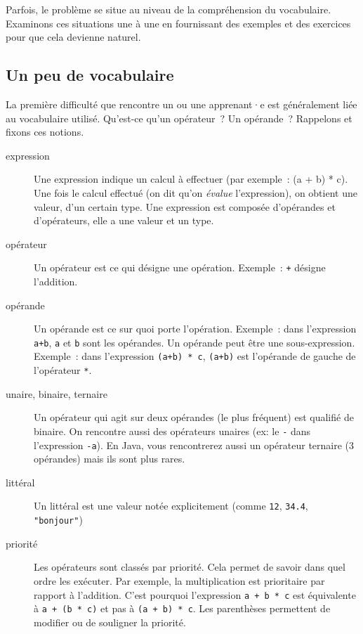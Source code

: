 		Parfois, le problème se situe au niveau de la compréhension du
		vocabulaire.  Examinons ces situations une à une en fournissant des
		exemples et des exercices pour que cela devienne naturel.

		\subsection{Un peu de vocabulaire}

			La première difficulté que rencontre un ou une apprenant·e est
			généralement liée au vocabulaire utilisé.  Qu’est-ce qu'un
			opérateur~? Un opérande~?  Rappelons et fixons ces notions.
			
			\begin{description}
			\item[expression]
				Une expression indique un calcul à effectuer
				(par exemple~: (a + b) * c).
				Une fois le calcul effectué
				(on dit qu’on \emph{évalue} l’expression), 
				on obtient une valeur, d’un certain type.
				Une expression est composée d’opérandes et d’opérateurs,
				elle a une valeur et un type.
			\item[opérateur]
				Un opérateur est ce qui désigne une opération.
				Exemple~: \Verb_+_ désigne l’addition.
			\item[opérande]
				Un opérande est ce sur quoi porte l’opération.
				Exemple~: dans l’expression \Verb_a+b_, 
				\Verb_a_ et \Verb_b_ sont les opérandes.
				Un opérande peut être une sous-expression.
				Exemple~: dans l’expression \Verb_(a+b) * c_, 
				\Verb_(a+b)_ est l’opérande 
				de gauche de l’opérateur \Verb_*_.
			\item[unaire, binaire, ternaire]
				Un opérateur qui agit sur deux opérandes (le plus fréquent)
				est qualifié de binaire. 
				On rencontre aussi des opérateurs unaires (ex: le \Verb_-_ 
				dans l’expression \Verb_-a_).
				En Java, vous rencontrerez aussi un opérateur ternaire (3 opérandes)
				mais ils sont plus rares.
			\item[littéral]
				Un littéral est une valeur notée explicitement 
				(comme \Verb_12_, \Verb_34.4_, \Verb_"bonjour"_)
			\item[priorité]

				Les opérateurs sont classés par priorité.  Cela permet de savoir
				dans quel ordre les exécuter.  Par exemple, la multiplication
				est prioritaire par rapport à l'addition.  C’est pourquoi
				l'expression \Verb_a + b * c_ est équivalente à 
				\Verb_a + (b * c)_ et pas à \Verb_(a + b) * c_.  
				Les parenthèses permettent
				de modifier ou de souligner la priorité.  
		
		\end{description}
			
